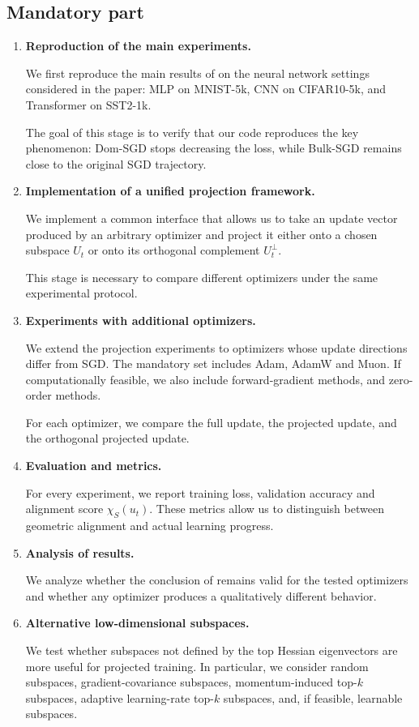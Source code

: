 \documentclass[conference]{IEEEtran}
\begin{document}
\subsection{Mandatory part}
\begin{enumerate}
    \item \textbf{Reproduction of the main experiments.}
    
    We first reproduce the main results of \citet{SongDoesSGD} on the neural network settings considered in the paper: MLP on MNIST-5k, CNN on CIFAR10-5k, and Transformer on SST2-1k.
    
    The goal of this stage is to verify that our code reproduces the key phenomenon: Dom-SGD stops decreasing the loss, while Bulk-SGD remains close to the original SGD trajectory.
    \item \textbf{Implementation of a unified projection framework.}
    
    We implement a common interface that allows us to take an update vector produced by an arbitrary optimizer and project it either onto a chosen subspace \(U_t\) or onto its orthogonal complement \(U_t^\perp\). 
    
    This stage is necessary to compare different optimizers under the same experimental protocol.
    \item \textbf{Experiments with additional optimizers.}
    
    We extend the projection experiments to optimizers whose update directions differ from SGD. The mandatory set includes Adam, AdamW and Muon. If computationally feasible, we also include forward-gradient methods, and zero-order methods.
    
    For each optimizer, we compare the full update, the projected update, and the orthogonal projected update.
    \item \textbf{Evaluation and metrics.}
    
    For every experiment, we report training loss, validation accuracy and alignment score \(\chi_S(u_t)\). These metrics allow us to distinguish between geometric alignment and actual learning progress.
    \item \textbf{Analysis of results.}
    
    We analyze whether the conclusion of \citet{SongDoesSGD} remains valid for the tested optimizers and whether any optimizer produces a qualitatively different behavior.

    \item \textbf{Alternative low-dimensional subspaces.}
    
    We test whether subspaces not defined by the top Hessian eigenvectors are more useful for projected training. In particular, we consider random subspaces, gradient-covariance subspaces, momentum-induced top-$k$ subspaces, adaptive learning-rate top-$k$ subspaces, and, if feasible, learnable subspaces.
\end{enumerate}
\end{document}
